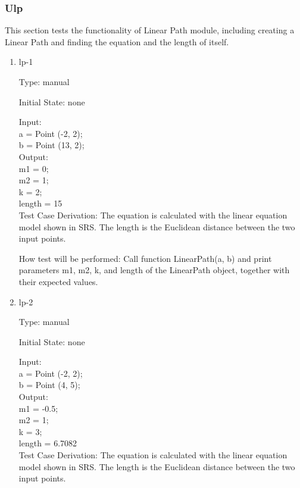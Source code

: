 \documentclass[12pt, titlepage]{article}
\begin{document}
\subsubsection{Ulp}
\label{LP}

This section tests the functionality of Linear Path module, including creating a Linear Path and finding the equation and the length of itself.

\begin{enumerate}

\item{lp-1\\}

Type: manual
					
Initial State: none
					
Input: \\
a = Point (-2, 2);\\
b = Point (13, 2);\\
					
Output: \\
m1 = 0;\\
m2 = 1;\\
k = 2;\\
length = 15\\

Test Case Derivation: The equation is calculated with the linear equation model shown in SRS. The length is the Euclidean distance between the two input points.

How test will be performed: Call function LinearPath(a, b) and print parameters m1, m2, k, and  length of the LinearPath object, together with their expected values.

\item{lp-2\\}

Type: manual
					
Initial State: none
					
Input: \\
a = Point (-2, 2);\\
b = Point (4, 5);\\
					
Output: \\
m1 = -0.5;\\
m2 = 1;\\
k = 3;\\
length = 6.7082\\

Test Case Derivation: The equation is calculated with the linear equation model shown in SRS. The length is the Euclidean distance between the two input points.


\end{enumerate}
\end{document}
